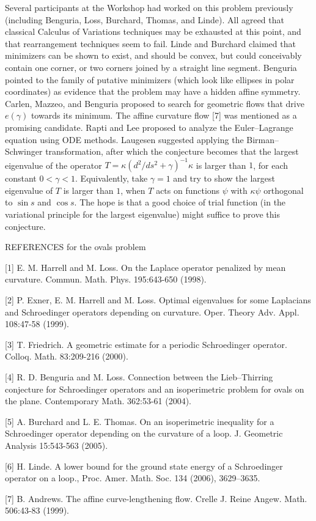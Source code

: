 \documentclass[12pt,letterpaper, reqno]{amsart}
\begin{document}
\begin{problemblock}
\begin{remark}
Several participants at the Workshop had worked on this problem
previously (including Benguria, Loss, Burchard, Thomas, and Linde).
All agreed that classical Calculus of Variations techniques may be
exhausted at this point, and that rearrangement techniques seem to
fail. Linde and Burchard claimed that minimizers can be shown to
exist, and should be convex, but could conceivably contain one
corner, or two corners joined by a straight line segment.  Benguria
pointed to the family of putative minimizers (which look like
ellipses in polar coordinates) as evidence that the problem may have
a hidden affine symmetry. Carlen, Mazzeo, and Benguria proposed to
search for geometric flows that drive $e(\gamma)$ towards its
minimum. The affine curvature flow [7] was mentioned as a promising
candidate. Rapti and Lee proposed to analyze the Euler--Lagrange
equation using ODE methods. Laugesen suggested applying the
Birman--Schwinger transformation, after which the conjecture becomes
that the largest eigenvalue of the operator $T = \kappa (d^2/ds^2 +
\gamma)^{-1} \kappa$ is larger than $1$, for each constant
$0<\gamma<1$. Equivalently, take $\gamma=1$ and try to show the
largest eigenvalue of $T$ is larger than $1$, when $T$ acts on
functions $\psi$ with $\kappa \psi$ orthogonal to $\sin s$ and $\cos
s$. The hope is that a good choice of trial function (in the
variational principle for the largest eigenvalue) might suffice to
prove this conjecture.
\end{remark}

REFERENCES for the ovals problem


[1] E. M. Harrell and M. Loss. On the Laplace operator
penalized by mean curvature. Commun. Math. Phys. 195:643-650
(1998).

[2] P. Exner, E. M. Harrell and M. Loss. Optimal
eigenvalues  for some Laplacians and Schroedinger operators
depending on curvature. Oper. Theory Adv. Appl. 108:47-58 (1999).

[3] T. Friedrich. A geometric estimate for
a periodic Schroedinger operator. Colloq. Math. 83:209-216 (2000).

[4] R. D. Benguria and M. Loss. Connection between
the Lieb--Thirring conjecture for Schroedinger operators and an
isoperimetric problem for ovals on the plane. Contemporary Math.
362:53-61 (2004).

[5] A. Burchard and L. E. Thomas. On an isoperimetric inequality
for a Schroedinger operator depending on the curvature of a loop.
J. Geometric Analysis 15:543-563 (2005).

[6] H. Linde. A lower bound for the ground state energy of a
Schroedinger operator on a loop.,
Proc. Amer. Math. Soc. 134 (2006), 3629--3635.


[7]  B. Andrews. The affine curve-lengthening flow.
Crelle J. Reine Angew. Math. 506:43-83 (1999).

\end{problemblock}
\end{document}
